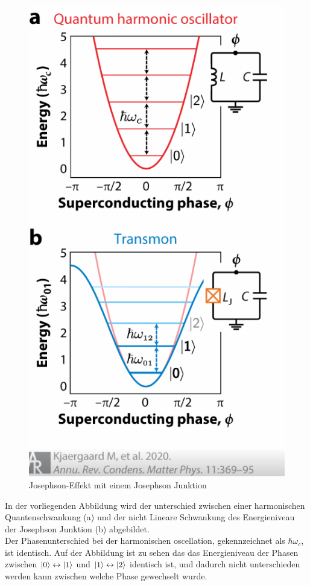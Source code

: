 \begin{figure}[!ht]
    \centering
    \includegraphics[width=0.75\linewidth]{img/JJ.png}
    \caption{Josephson-Effekt mit einem Josephson Junktion}
    \label{fig:Josephson-junktion}
\end{figure}

In der vorliegenden Abbildung wird der unterschied zwischen einer harmonischen Quantenschwankung (a) und der nicht Lineare Schwankung des Energieniveau der Josephson Junktion (b) abgebildet.\\

Der Phasenunterschied bei der harmonischen oscellation, gekennzeichnet als $\hbar\omega_c$, ist identisch. Auf der Abbildung ist zu sehen das das Energieniveau der Phasen zwischen $\ket{0} \leftrightarrow \ket{1}$
und $\ket{1} \leftrightarrow \ket{2}$ identisch ist, und dadurch nicht unterschieden werden kann zwischen welche Phase gewechselt wurde.\\

